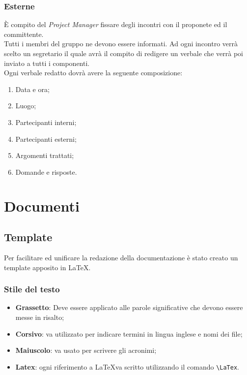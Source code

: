 \documentclass[12pt,a4paper,titlepage]{article}
\begin{document}
\subsubsection{Esterne}
È compito del \textit{Project Manager} fissare degli incontri con il proponete ed il committente.\\
Tutti i membri del gruppo ne devono essere informati. Ad ogni incontro verrà scelto un 
segretario il quale avrà il compito di redigere un verbale che verrà poi inviato a tutti
i componenti.\\
Ogni verbale redatto dovrà avere la seguente composizione: 
\begin{enumerate}
\item Data e ora;
\item Luogo;
\item Partecipanti interni;
\item Partecipanti esterni;
\item Argomenti trattati;
\item Domande e risposte.
\end{enumerate}
\newpage
{}
\section{Documenti}
\subsection{Template}
Per facilitare ed unificare la redazione della documentazione è stato creato un 
template apposito in \LaTeX.
\subsubsection{Stile del testo}
\begin{itemize}
\item \textbf{Grassetto}: Deve essere applicato alle parole significative che devono essere messe in risalto;
\item \textbf{Corsivo}: va utilizzato per indicare termini in lingua inglese e nomi dei file;
\item \textbf{Maiuscolo}: va usato per scrivere gli acronimi;
\item \textbf{Latex}: ogni riferimento a \LaTeX va scritto utilizzando il comando \verb|\LaTex|.
\end{itemize}
\end{document}
